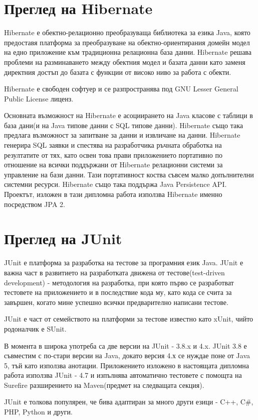 \section{Преглед на Hibernate}
Hibernate е обектно-релационно преобразуваща библиотека за езика Java,
която предоставя платформа за преобразуване на обектно-ориентирания
домейн модел на едно приложение към традиционна релационна база
данни. Hibernate решава проблеми на разминаването между обектния модел
и базата данни като заменя директния достъп до базата с функции от
високо ниво за работа с обекти.

Hibernate е свободен софтуер и се разпространява под GNU Lesser
General Public License лиценз.

Основната възможност на Hibernate е асоциирането на Java класове с
таблици в база дани(и на Java типове данни с SQL типове
данни). Hibernate също така предлага възможност за запитване за данни
и извличане на данни. Hibernate генерира SQL заявки и спестява на
разработчика ръчната обработка на резултатите от тях, като освен това
прави приложението портативно по отношение на всички поддържани от
Hibernate релационни системи за управление на бази данни. Тази
портативност коства съвсем малко допълнителни системни
ресурси. Hibernate също така поддържа Java Persistence API. Проектът,
изложен в тази дипломна работа използва Hibernate именно посредством
JPA 2.
\section{Преглед на JUnit}
JUnit е платформа за разработка на тестове за програмния език
Java. JUnit е важна част в развитието на разработката движена от
тестове(test-driven development) - методология на разработка, при
която първо се разработват тестовете на приложението и в последствие
кода му, като кода се счита за завършен, когато мине успешно всички
предварително написани тестове. 

JUnit е част от семейството на платформи за тестове известно като
xUnit, чийто родоналчик е SUnit.

В момента в широка употреба са две версии на JUnit - 3.8.x и
4.x. JUnit 3.8 е съвместим с по-стари версии на Java, докато версия
4.х се нуждае поне от Java 5, тъй като използва анотации. Приложението
изложено в настоящата дипломна работа използва JUnit - 4.7 и изпълнява
автоматично тестовете с помощта на Surefire разширението на
Maven(предмет на следващата секция).

JUnit е толкова популярен, че бива адаптиран за много други езици -
C++, C\#, PHP, Python и други.
